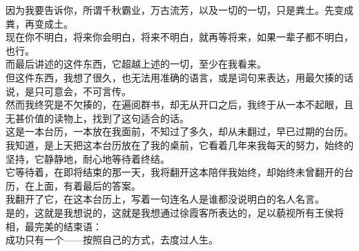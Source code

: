 \begin{multicols}{\theparacolNo}
因为我要告诉你，所谓千秋霸业，万古流芳，以及一切的一切，只是粪土。先变成粪，再变成土。\\

现在你不明白，将来你会明白，将来不明白，就再等将来，如果一辈子都不明白，也行。\\

而最后讲述的这件东西，它超越上述的一切，至少在我看来。\\

但这件东西，我想了很久，也无法用准确的语言，或是词句来表达，用最欠揍的话说，是只可意会，不可言传。\\

然而我终究是不欠揍的，在遍阅群书，却无从开口之后，我终于从一本不起眼，且无甚价值的读物上，找到了这句适合的话。\\

这是一本台历，一本放在我面前，不知过了多久，却从未翻过，早已过期的台历。\\

我知道，是上天把这本台历放在了我的桌前，它看着几年来我每天的努力，始终的坚持，它静静地，耐心地等待着终结。\\

它等待着，在即将结束的那一天，我将翻开这本陪伴我始终，却始终未曾翻开的台历，在上面，有着最后的答案。\\

我翻开了它，在这本台历上，写着一句连名人是谁都没说明白的名人名言。\\

是的，这就是我想说的，这就是我想通过徐霞客所表达的，足以藐视所有王侯将相，最完美的结束语：\\

成功只有一个——按照自己的方式，去度过人生。\\
\ifnum{}
	\end{multicols}
\fi
